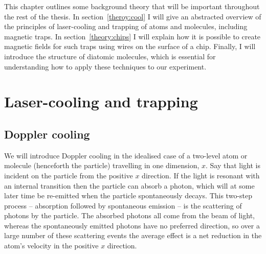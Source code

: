 This chapter outlines some background theory that will be important throughout
the rest of the thesis. In section~\ref{theroy:cool} I will give an abstracted
overview of the principles of laser-cooling and trapping of atoms and
molecules, including magnetic traps. In section~\ref{theory:chips} I will
explain how it is possible to create magnetic fields for such traps using wires
on the surface of a chip. Finally, I will introduce the structure of diatomic
molecules, which is essential for understanding how to apply these techniques
to our experiment.

\section{Laser-cooling and trapping}
\label{theory:cooltrap}

\subsection{Doppler cooling}

We will introduce Doppler cooling in the idealised case of a two-level atom or
molecule (henceforth the particle) travelling in one dimension, $x$.  Say that
light is incident on the particle from the positive $x$ direction. If the light
is resonant with an internal transition then the particle can absorb a photon,
which will at some later time be re-emitted when the particle spontaneously
decays.
%
This two-step process -- absorption followed by spontaneous emission -- is the
scattering of photons by the particle. The absorbed photons all come from the
beam of light, whereas the spontaneously emitted photons have no preferred
direction, so over a large number of these scattering events the average effect
is a net reduction in the atom's velocity in the positive $x$ direction.

